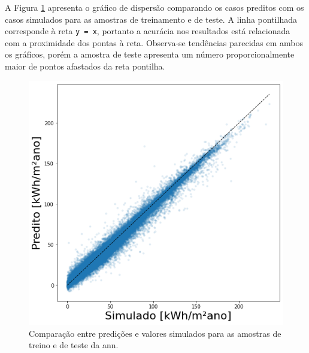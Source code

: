 \documentclass{article}
\begin{document}
A Figura \ref{fig:scattertrainann} apresenta o gráfico de dispersão comparando os casos preditos com os casos simulados para as amostras de treinamento e de teste. 
A linha pontilhada corresponde à reta \texttt{y = x}, portanto a acurácia nos resultados está relacionada com a proximidade dos pontas à reta. 
Observa-se tendências parecidas em ambos os gráficos, porém a amostra de teste apresenta um número proporcionalmente maior de pontos afastados da reta pontilha. 

\begin{figure}[!htb]
	\caption{Comparação entre predições e valores simulados para as amostras de treino e de teste da \acrshort{ann}.} %
	\label{fig:scattertrainann}
	\centering
	\begin{minipage}{.5\textwidth}
		\centering
		\includegraphics[width=\linewidth]{scatter_train_ann.png}
	\end{minipage}%
	\begin{minipage}{.5\textwidth}
		\centering

\end{minipage}
\end{figure}
\end{document}
